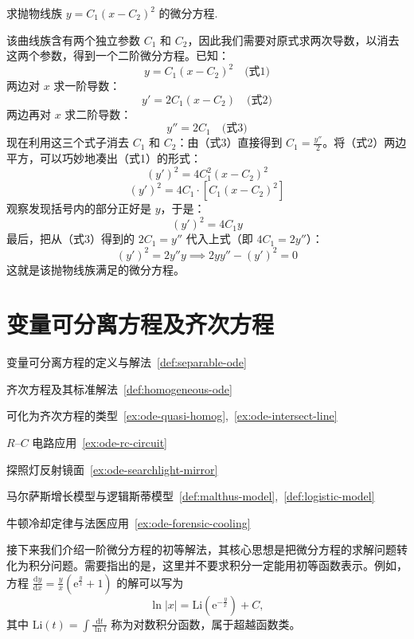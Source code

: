 \documentclass[lang=cn,11pt]{elegantbook}
\begin{document}
\begin{exercise}[曲线族对应微分方程]
求抛物线族 $\displaystyle y=C_1(x-C_2)^2$ 的微分方程.
\end{exercise}
\begin{solution}
该曲线族含有两个独立参数 $C_1$ 和 $C_2$，因此我们需要对原式求两次导数，以消去这两个参数，得到一个二阶微分方程。已知：$$y = C_1(x-C_2)^2 \quad \text{(式1)}$$两边对 $x$ 求一阶导数：$$y' = 2C_1(x-C_2) \quad \text{(式2)}$$两边再对 $x$ 求二阶导数：$$y'' = 2C_1 \quad \text{(式3)}$$现在利用这三个式子消去 $C_1$ 和 $C_2$：由（式3）直接得到 $C_1 = \frac{y''}{2}$。将（式2）两边平方，可以巧妙地凑出（式1）的形式：$$(y')^2 = 4C_1^2(x-C_2)^2$$$$(y')^2 = 4C_1 \cdot [C_1(x-C_2)^2]$$观察发现括号内的部分正好是 $y$，于是：$$(y')^2 = 4C_1 y$$最后，把从（式3）得到的 $2C_1 = y''$ 代入上式（即 $4C_1 = 2y''$）：$$(y')^2 = 2y'' y\implies 2yy'' - (y')^2 = 0$$这就是该抛物线族满足的微分方程。
\end{solution}


\section{变量可分离方程及齐次方程}

\begin{introduction}
  \item 变量可分离方程的定义与解法~\ref{def:separable-ode}
  \item 齐次方程及其标准解法~\ref{def:homogeneous-ode}
  \item 可化为齐次方程的类型~\ref{ex:ode-quasi-homog},~\ref{ex:ode-intersect-line}
  \item $R$--$C$ 电路应用~\ref{ex:ode-rc-circuit}
  \item 探照灯反射镜面~\ref{ex:ode-searchlight-mirror}
  \item 马尔萨斯增长模型与逻辑斯蒂模型~\ref{def:malthus-model},~\ref{def:logistic-model}
  \item 牛顿冷却定律与法医应用~\ref{ex:ode-forensic-cooling}
\end{introduction}

接下来我们介绍一阶微分方程的初等解法，其核心思想是把微分方程的求解问题转化为积分问题。需要指出的是，这里并不要求积分一定能用初等函数表示。例如，方程
$\displaystyle \frac{\mathrm{d}y}{\mathrm{d}x}=\frac{y}{x}\left(\mathrm{e}^{\frac{y}{x}}+1\right)$ 的解可以写为
\[
\ln|x| = \mathrm{Li}\!\left(\mathrm{e}^{-\frac{y}{x}}\right) + C,
\]
其中 $\mathrm{Li}(t)=\displaystyle\int\frac{\mathrm{d}t}{\ln t}$ 称为对数积分函数，属于超越函数类。
\end{document}

